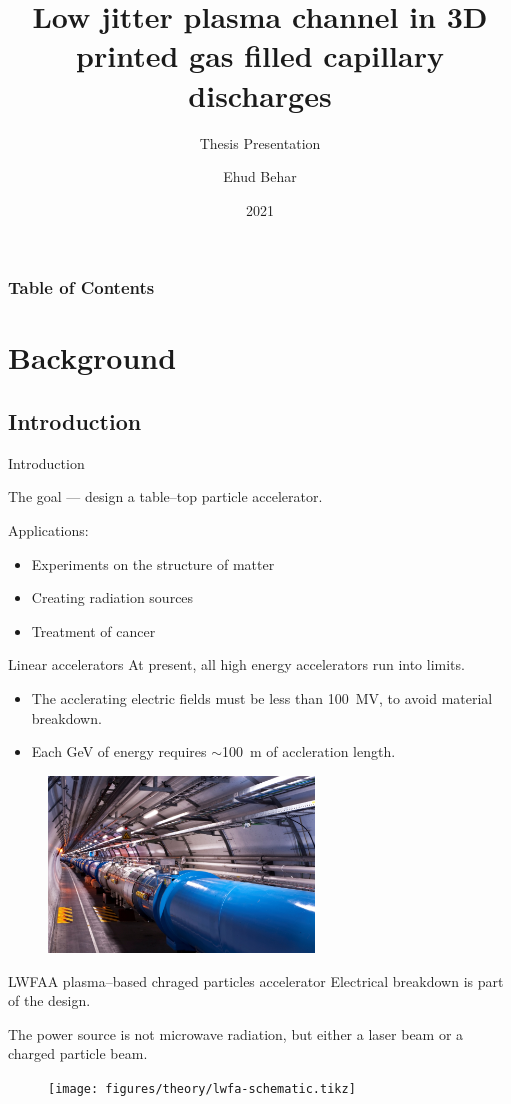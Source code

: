 \documentclass[dvipsnames]{beamer}
\title{Low jitter plasma channel in 3D printed gas filled capillary discharges}
\subtitle{Thesis Presentation}
\author{Ehud Behar}
\institute{Hebrew University of Jerusalem}
\date{2021}
\begin{document}
\frame{\titlepage}
\begin{frame}
\frametitle{Table of Contents}
\tableofcontents
\end{frame}

\section{Background}
\subsection{Introduction}
  \begin{frame}{Introduction}
  \begin{center}
    The goal --- design a table--top particle accelerator.
  \end{center}
    Applications:
    \begin{itemize}
        \item[\textbullet] Experiments on the structure of matter
        \item[\textbullet] Creating radiation sources
        \item[\textbullet] Treatment of cancer
    \end{itemize}
  \end{frame}

\begin{frame}{Linear accelerators}
At present, all high energy accelerators run into limits.
\begin{itemize}
\item[\textbullet] The acclerating electric fields must be less than \SI{100}{\mega \V}, to avoid material breakdown.
\item[\textbullet] Each \si{\giga \eV} of energy requires $\sim$\SI{100}{\meter} of accleration length.
\end{itemize}
\begin{figure}
\includegraphics[width=200pt]{figures/theory/lhc_cern_compressed.jpg}
\end{figure}
\end{frame}
\begin{frame}{LWFA}{A plasma--based chraged particles accelerator}
Electrical breakdown is part of the design.

The power source is not microwave radiation, but either a laser beam or a charged particle beam.
\begin{figure}
\texttt{[image: figures/theory/lwfa-schematic.tikz]}
\end{figure}
\end{frame}
\end{document}
